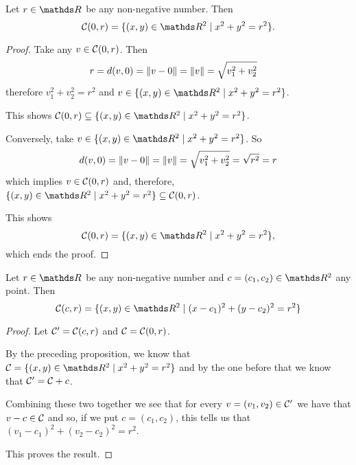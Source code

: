 \begin{prop}
	Let $r\in \R$ be any non-negative number. Then
	\[\mc C(0,r)=\{(x,y)\in \R^2\mid x^2+y^2=r^2\}.\]
\end{prop}
\begin{proof}
	Take any $v\in \mathcal C(0,r)$. Then 
	\begin{align*}
		r&=d(v,0)=\lVert v-0\rVert=\lVert v\rVert=\sqrt{v_1^2+v_2^2}
	\end{align*}therefore $v_1^2+v_2^2=r^2$ and $v\in\{(x,y)\in \R^2\mid x^2+y^2=r^2\}$.
	
	This shows $\mc C(0,r)\subseteq\{(x,y)\in \R^2\mid x^2+y^2=r^2\}$.
	
	Conversely, take $v\in \{(x,y)\in \R^2\mid x^2+y^2=r^2\}$. So
	\[d(v,0)=\lVert v-0\rVert=\lVert v\rVert=\sqrt{v_1^2+v_2^2}=\sqrt{r^2}=r\]which implies $v\in \mathcal C(0,r)$ and, therefore, $\{(x,y)\in \R^2\mid x^2+y^2=r^2\}\subseteq \mc C(0,r)$.
	
	This shows \[\mc C(0,r)=\{(x,y)\in \R^2\mid x^2+y^2=r^2\},\]which ends the proof.
\end{proof}
\begin{cor}
	Let $r\in \R$ be any non-negative number and $c=(c_1,c_2)\in \R^2$ any point. Then $$\mc C(c,r)=\{(x,y)\in\R^2\mid (x-c_1)^2+(y-c_2)^2=r^2\}$$
\end{cor}
\begin{proof}
	Let $\mathcal C'=\mathcal C(c,r)$ and $\mathcal C=\mathcal C(0,r)$.
	 
	By the preceding proposition, we know that $\mc C=\{(x,y)\in\R^2\mid x^2+y^2=r^2\}$ and by the one before that we know that $\mathcal C'=\mathcal C+c$.
	
	Combining these two together we see that for every $v=(v_1,v_2)\in \mathcal C'$ we have that $v-c\in \mathcal C$ and so, if we put $c=(c_1,c_2)$, this tells us that $(v_1-c_1)^2+(v_2-c_2)^2=r^2$.
	
	This proves the result.
\end{proof}

